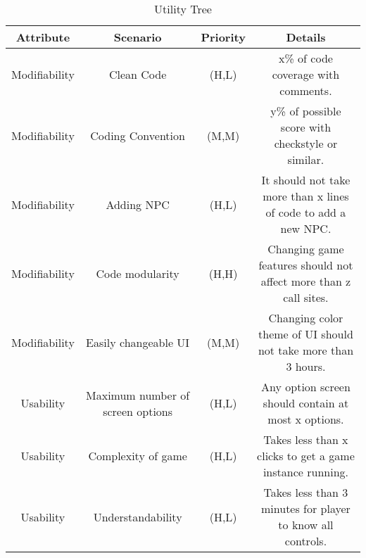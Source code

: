\begin{table}[H]
	\begin{center}
		\begin{tabular}{| c | c | c | c |}
    		\hline
		        \textbf{Attribute}		&	\textbf{Scenario} 	&   \textbf{Priority} 	& \textbf{Details} 			\\															
			\hline
			Modifiability			& 	Clean Code		& 	(H,L)			& x\% of code coverage with comments. 	\\
			Modifiability			&	Coding Convention	& 	(M,M)			& y\% of possible score with checkstyle or similar. \\
                        Modifiability & Adding NPC & (H,L) & It should not take more than x lines of code to add a new NPC. \\
                        Modifiability & Code modularity & (H,H) & Changing game features should not affect more than z call sites. \\
                        Modifiability & Easily changeable UI & (M,M) & Changing color theme of UI should not take more than 3 hours. \\
                        Usability & Maximum number of screen options & (H,L) & Any option screen should contain at most x options. \\
                        Usability & Complexity of game & (H,L) & Takes less than x clicks to get a game instance running. \\
                        Usability & Understandability & (H,L) & Takes less than 3 minutes for player to know all controls. \\
			\hline
    	\end{tabular}
	\end{center}
	\label{tab:Utility_tree}
	\caption{Utility Tree}
\end{table}
